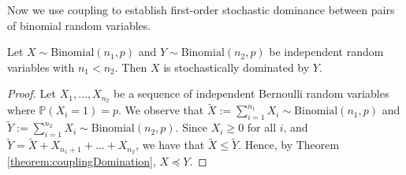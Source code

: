 Now we use coupling to establish first-order stochastic dominance between pairs of binomial random variables.

\begin{theorem}\label{theorem:binomialDomination}
	Let $X \sim \text{Binomial}(n_1, p)$ and $Y \sim \text{Binomial}(n_2, p)$ be independent random variables with $n_1 < n_2$. Then $X$ is stochastically dominated by $Y$.
\end{theorem}

\begin{proof}
	Let $X_1, \dots, X_{n_2}$ be a sequence of independent Bernoulli random variables where $\mathbb{P}(X_i = 1) = p$. We observe that $\tilde{X} := \sum_{i=1}^{n_1} X_i \sim \text{Binomial}(n_1, p)$ and $\tilde{Y} := \sum_{i=1}^{n_2} X_i \sim \text{Binomial}(n_2, p)$. Since $X_i \geq 0$ for all $i$, and $\tilde{Y} = \tilde{X} + X_{n_1 + 1} + \dots + X_{n_2}$, we have that $\tilde{X} \leq \tilde{Y}$. Hence, by Theorem \ref{theorem:couplingDomination}, $X \preceq Y$.
\end{proof}
